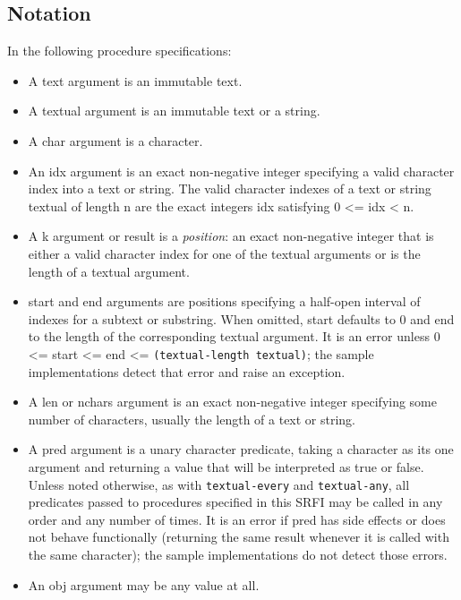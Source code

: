 \subsection{{Notation}}\label{notation}

In the following procedure specifications:

\begin{itemize}
\tightlist
\item
  A text argument is an immutable text.
\item
  A textual argument is an immutable text or a string.
\item
  A char argument is a character.
\item
  An idx argument is an exact non-negative integer specifying a valid
  character index into a text or string. The valid character indexes of
  a text or string textual of length n are the exact integers idx
  satisfying 0 \textless{}= idx \textless{} n.
\item
  A k argument or result is a \emph{position}: an exact non-negative
  integer that is either a valid character index for one of the textual
  arguments or is the length of a textual argument.
\item
  start and end arguments are positions specifying a half-open interval
  of indexes for a subtext or substring. When omitted, start defaults to
  0 and end to the length of the corresponding textual argument. It is
  an error unless 0 \textless{}= start \textless{}= end \textless{}=
  \texttt{(textual-length\ textual)}; the sample implementations detect
  that error and raise an exception.
\item
  A len or nchars argument is an exact non-negative integer specifying
  some number of characters, usually the length of a text or string.
\item
  A pred argument is a unary character predicate, taking a character as
  its one argument and returning a value that will be interpreted as
  true or false. Unless noted otherwise, as with \texttt{textual-every}
  and \texttt{textual-any}, all predicates passed to procedures
  specified in this SRFI may be called in any order and any number of
  times. It is an error if pred has side effects or does not behave
  functionally (returning the same result whenever it is called with the
  same character); the sample implementations do not detect those
  errors.
\item
  An obj argument may be any value at all.
\end{itemize}

